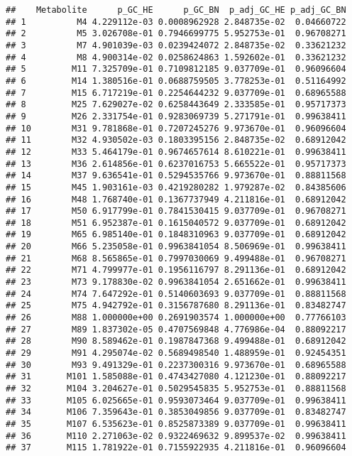 \documentclass[
]{article}
\begin{document}
\begin{verbatim}
##    Metabolite      p_GC_HE      p_GC_BN  p_adj_GC_HE p_adj_GC_BN
## 1          M4 4.229112e-03 0.0008962928 2.848735e-02  0.04660722
## 2          M5 3.026708e-01 0.7946699775 5.952753e-01  0.96708271
## 3          M7 4.901039e-03 0.0239424072 2.848735e-02  0.33621232
## 4          M8 4.900314e-02 0.0258624863 1.592602e-01  0.33621232
## 5         M11 7.325709e-01 0.7109812185 9.037709e-01  0.96096604
## 6         M14 1.380516e-01 0.0688759505 3.778253e-01  0.51164992
## 7         M15 6.717219e-01 0.2254644232 9.037709e-01  0.68965588
## 8         M25 7.629027e-02 0.6258443649 2.333585e-01  0.95717373
## 9         M26 2.331754e-01 0.9283069739 5.271791e-01  0.99638411
## 10        M31 9.781868e-01 0.7207245276 9.973670e-01  0.96096604
## 11        M32 4.930502e-03 0.1803395156 2.848735e-02  0.68912042
## 12        M33 5.464179e-01 0.9674657614 8.610221e-01  0.99638411
## 13        M36 2.614856e-01 0.6237016753 5.665522e-01  0.95717373
## 14        M37 9.636541e-01 0.5294535766 9.973670e-01  0.88811568
## 15        M45 1.903161e-03 0.4219280282 1.979287e-02  0.84385606
## 16        M48 1.768740e-01 0.1367737949 4.211816e-01  0.68912042
## 17        M50 6.917799e-01 0.7841530415 9.037709e-01  0.96708271
## 18        M51 6.952387e-01 0.1615040572 9.037709e-01  0.68912042
## 19        M65 6.985140e-01 0.1848310963 9.037709e-01  0.68912042
## 20        M66 5.235058e-01 0.9963841054 8.506969e-01  0.99638411
## 21        M68 8.565865e-01 0.7997030069 9.499488e-01  0.96708271
## 22        M71 4.799977e-01 0.1956116797 8.291136e-01  0.68912042
## 23        M73 9.178830e-02 0.9963841054 2.651662e-01  0.99638411
## 24        M74 7.647292e-01 0.5140603693 9.037709e-01  0.88811568
## 25        M75 4.942792e-01 0.3156787680 8.291136e-01  0.83482747
## 26        M88 1.000000e+00 0.2691903574 1.000000e+00  0.77766103
## 27        M89 1.837302e-05 0.4707569848 4.776986e-04  0.88092217
## 28        M90 8.589462e-01 0.1987847368 9.499488e-01  0.68912042
## 29        M91 4.295074e-02 0.5689498540 1.488959e-01  0.92454351
## 30        M93 9.491329e-01 0.2237300316 9.973670e-01  0.68965588
## 31       M101 1.585088e-01 0.4743427080 4.121230e-01  0.88092217
## 32       M104 3.204627e-01 0.5029545835 5.952753e-01  0.88811568
## 33       M105 6.025665e-01 0.9593073464 9.037709e-01  0.99638411
## 34       M106 7.359643e-01 0.3853049856 9.037709e-01  0.83482747
## 35       M107 6.535623e-01 0.8525873389 9.037709e-01  0.99638411
## 36       M110 2.271063e-02 0.9322469632 9.899537e-02  0.99638411
## 37       M115 1.781922e-01 0.7155922935 4.211816e-01  0.96096604

\end{verbatim}
\end{document}
